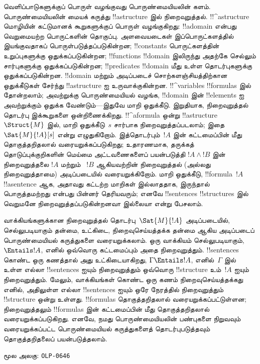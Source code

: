 \documentclass[11pt,a4paper,openany]{memoir}
\makeatletter
\newcommand\TADriverHeadingMode{\def\ol@chaptercs{section}\def\ol@partcs{section}}
\makeatother
\begin{document}
வெளிப்பாடுகளுக்குப் பொருள் வழங்குவது பொருண்மையியலின் களம். பொருண்மையியலின்
மையக் கருத்து !!a{structure} இல் நிறைவுறுத்தல். !!^a{structure} மொழியின்
கட்டுமானக் கூறுகளுக்குப் பொருள் வழங்குகிறது: !!a{domain} என்பது வெறுமையற்ற
பொருட்களின் தொகுப்பு. அளவையடைகள் இப்பொருட்களத்தில் இயங்குவதாகப்
பொருள்படுத்தப்படுகின்றன; !!{constant}s பொருட்களத்தின் உறுப்புகளுக்கு
ஒதுக்கப்படுகின்றன; !!{function}s !!{domain} இலிருந்து அதற்கே செல்லும்
சார்புகளுக்கு ஒதுக்கப்படுகின்றன; !!{predicate}s !!{domain} மீது உள்ள
தொடர்புகளுக்கு ஒதுக்கப்படுகின்றன. !!{domain} மற்றும் அடிப்படைச்
சொற்களஞ்சியத்திற்கான ஒதுக்கீடுகள் சேர்ந்து !!a{structure} ஐ உருவாக்குகின்றன.
!!^{variable}s !!{formula}s இல் தோன்றலாம்; அவற்றுக்கு பொருண்மையியல்
வழங்க, !!{domain} இன் !!{element}s ஐ அவற்றுக்கும் ஒதுக்க வேண்டும்---இதுவே
மாறி ஒதுக்கீடு. இறுதியாக, நிறைவுறுத்தல் தொடர்பு இக்கூறுகளை ஒன்றிணைக்கிறது.
!!^a{formula} ஒன்று !!a{structure}~$\Struct{M}$ இல்,
மாறி ஒதுக்கீடு~$s$ சார்பாக நிறைவுறுத்தப்படலாம்; இதை
$\Sat{M}{!A}[s]$ என்று எழுதுகிறோம். இத்தொடர்பும்~$!A$ இன் கட்டமைப்பின்
மீது தொகுத்தறிதலால் வரையறுக்கப்படுகிறது; உதாரணமாக, தருக்கத் தொடுப்புக்குறிகளின்
மெய்மை அட்டவணைகளைப் பயன்படுத்தி $!A \land !B$ இன் நிறைவுறுத்தலை
$!A$ மற்றும் ~$!B$ ஆகியவற்றின் நிறைவுறுத்தல் (அல்லது நிறைவுறுத்தாமை) அடிப்படையில்
வரையறுக்கிறோம். மாறி ஒதுக்கீடு, !!{formula}~$!A$
!!a{sentence} ஆக, அதாவது கட்டற்ற மாறிகள் இல்லாததாக, இருந்தால் பொருத்தமற்றது
என்பது பின்னர் தெரியவரும்; எனவே !!{sentence}s !!{structure}s இல்
வெறுமனே நிறைவுறுத்தப்படுகின்றனவா இல்லையா என்று பேசலாம்.

வாக்கியங்களுக்கான நிறைவுறுத்தல் தொடர்பு~$\Sat{M}{!A}$ அடிப்படையில்,
செல்லுபடியாகும் தன்மை, உட்கிடை, நிறைவுசெய்யத்தக்க தன்மை ஆகிய அடிப்படைப்
பொருண்மையியல் கருத்துகளை வரையறுக்கலாம். ஒரு வாக்கியம் செல்லுபடியாகும்,
$\Entails !A$, எனில் ஒவ்வொரு கட்டமைப்பும் அதை நிறைவுறுத்தும்.
!!{sentence}s கொண்ட ஒரு கணத்தால் அது உட்கிடையாகிறது,
$\Gamma \Entails !A$, எனில்~$\Gamma$ இல் உள்ள எல்லா !!{sentence}s ஐயும்
நிறைவுறுத்தும் ஒவ்வொரு !!{structure} உம்~$!A$ ஐயும் நிறைவுறுத்தும்.
மேலும், வாக்கியங்கள் கொண்ட ஒரு கணம் நிறைவுசெய்யத்தக்கது எனில், அதிலுள்ள
எல்லா !!{sentence}s ஐயும் ஒரே நேரத்தில் நிறைவுறுத்தும் !!{structure} ஒன்று
உள்ளது. !!{formula}s தொகுத்தறிதலால் வரையறுக்கப்பட்டுள்ளன; நிறைவுறுத்தலும்
!!{formula}s இன் கட்டமைப்பின் மீது தொகுத்தறிதலால் வரையறுக்கப்படுகிறது.
எனவே, நமது பொருண்மையியலின் பண்புகளை நிறுவவும் வரையறுக்கப்பட்ட
பொருண்மையியல் கருத்துகளைத் தொடர்புபடுத்தவும் தொகுத்தறிதலைப் பயன்படுத்தலாம்.



\clearpage
\noindent மூல அலகு: \texttt{OLP-0646}\par
\begingroup
\TADriverHeadingMode
{}
\end{document}
